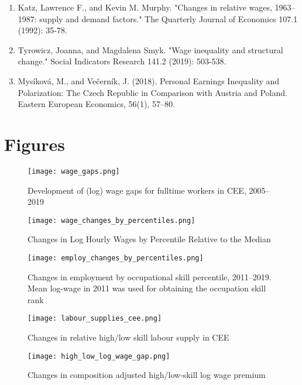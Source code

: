 \documentclass{article}
\begin{document}
\begin{enumerate}
\item Katz, Lawrence F., and Kevin M. Murphy. "Changes in relative wages, 1963–1987: supply and demand factors." The Quarterly Journal of Economics 107.1 (1992): 35-78.

\item Tyrowicz, Joanna, and Magdalena Smyk. "Wage inequality and structural change." Social Indicators Research 141.2 (2019): 503-538.

\item Mysíková, M., and Večerník, J. (2018). Personal Earnings Inequality and Polarization: The Czech Republic in Comparison with Austria and Poland. Eastern European Economics, 56(1), 57–80.

\end{enumerate}

\newpage
\section{Figures}

\begin{figure}[h]%
    \centering
    {\texttt{[image: wage\_gaps.png]} }
    \caption{Development of (log) wage gaps for fulltime workers in CEE, 2005–2019}
    \label{wage_gaps_CEE}
\end{figure}

\begin{figure}%
    \centering
    {\texttt{[image: wage\_changes\_by\_percentiles.png]} }
    \caption{Changes in Log Hourly Wages by Percentile Relative to the Median}
    \label{wage_changes_percentiles}
\end{figure}

\begin{figure}%
    \centering
    {\texttt{[image: employ\_changes\_by\_percentiles.png]} }
    \caption{Changes in employment by occupational skill percentile, 2011–2019. Mean log-wage in 2011 was used for obtaining the occupation skill rank}
    \label{employ_changes_percentiles}
\end{figure}

\begin{figure}%
        \centering 
        {\texttt{[image: labour\_supplies\_cee.png]}}
        \caption{Changes in relative high/low skill labour supply in CEE}
        \label{labour_supplies_cee}
\end{figure}

\begin{figure}%
    \centering 
    {\texttt{[image: high\_low\_log\_wage\_gap.png]}}
    \caption{Changes in composition adjusted high/low-skill log wage premium}
    \label{high_low_log_wage_gap}
\end{figure}
\end{document}
